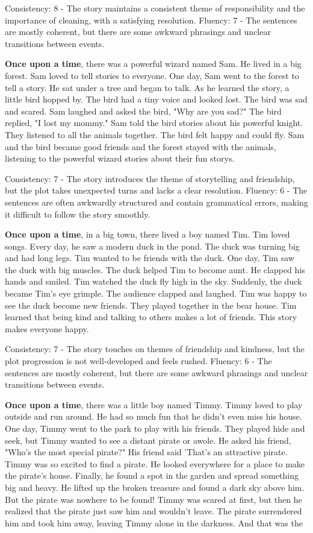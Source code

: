 \documentclass{article}
\begin{document}
Consistency: 8 - The story maintains a consistent theme of responsibility and the importance of cleaning, with a satisfying resolution.
Fluency: 7 - The sentences are mostly coherent, but there are some awkward phrasings and unclear transitions between events.

\textbf{Once upon a time}, there was a powerful wizard named Sam. He lived in a big forest. Sam loved to tell stories to everyone. One day, Sam went to the forest to tell a story. He sat under a tree and began to talk. As he learned the story, a little bird hopped by. The bird had a tiny voice and looked lost. The bird was sad and scared. Sam laughed and asked the bird, "Why are you sad?" The bird replied, "I lost my mommy." Sam told the bird stories about his powerful knight. They listened to all the animals together. The bird felt happy and could fly. Sam and the bird became good friends and the forest stayed with the animals, listening to the powerful wizard stories about their fun storys.

Consistency: 7 - The story introduces the theme of storytelling and friendship, but the plot takes unexpected turns and lacks a clear resolution.
Fluency: 6 - The sentences are often awkwardly structured and contain grammatical errors, making it difficult to follow the story smoothly.

\textbf{Once upon a time}, in a big town, there lived a boy named Tim. Tim loved songs. Every day, he saw a modern duck in the pond. The duck was turning big and had long legs. Tim wanted to be friends with the duck. One day, Tim saw the duck with big muscles. The duck helped Tim to become aunt. He clapped his hands and smiled. Tim watched the duck fly high in the sky. Suddenly, the duck became Tim's eye grimple. The audience clapped and laughed. Tim was happy to see the duck become new friends. They played together in the bear house. Tim learned that being kind and talking to others makes a lot of friends. This story makes everyone happy.

Consistency: 7 - The story touches on themes of friendship and kindness, but the plot progression is not well-developed and feels rushed.
Fluency: 6 - The sentences are mostly coherent, but there are some awkward phrasings and unclear transitions between events.

\textbf{Once upon a time}, there was a little boy named Timmy. Timmy loved to play outside and run around. He had so much fun that he didn't even miss his house. One day, Timmy went to the park to play with his friends. They played hide and seek, but Timmy wanted to see a distant pirate or awole. He asked his friend, "Who's the most special pirate?" His friend said 'That's an attractive pirate. Timmy was so excited to find a pirate. He looked everywhere for a place to make the pirate's house. Finally, he found a spot in the garden and spread something big and heavy. He lifted up the broken treasure and found a dark sky above him. But the pirate was nowhere to be found! Timmy was scared at first, but then he realized that the pirate just saw him and wouldn't leave. The pirate surrendered him and took him away, leaving Timmy alone in the darkness. And that was the
\end{document}
